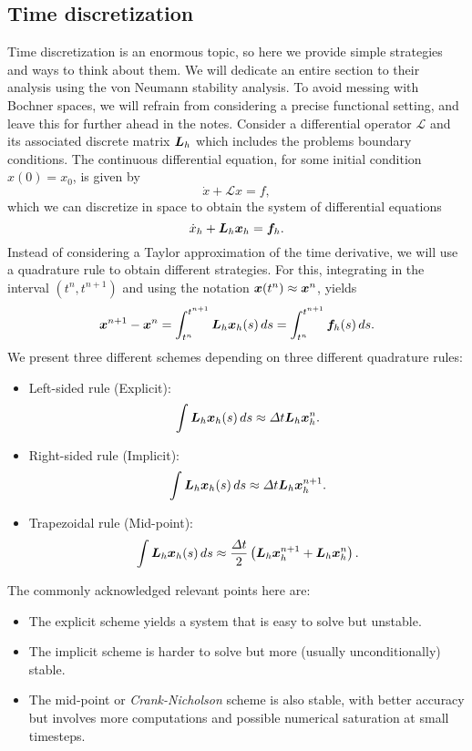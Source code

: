 \documentclass{article}
\renewcommand{\vec}{\vectorsym}
\newcommand{\mat}{\matrixsym}
\begin{document}
\subsection{Time discretization}
Time discretization is an enormous topic, so here we provide simple strategies and ways to think about them. We will dedicate an entire section to their analysis using the von Neumann stability analysis. To avoid messing with Bochner spaces, we will refrain from considering a precise functional setting, and leave this for further ahead in the notes. Consider a differential operator $\mathcal L$ and its associated discrete matrix $\mat L_h$ which includes the problems boundary conditions. The continuous differential equation, for some initial condition $x(0) = x_0$, is given by 
    $$ \dot x + \mathcal L x = f, $$
    which we can discretize in space to obtain the system of differential equations
    $$ \dot x_h + \mat L_h \vec x_h = \vec f_h. $$
    Instead of considering a Taylor approximation of the time derivative, we will use a quadrature rule to obtain different strategies. For this, integrating in the interval $(t^n, t^{n+1})$ and using the notation $\vec x(t^n) \approx \vec x^{n}$, yields
    $$ \vec x^{n+1} - \vec x^n = \int_{t^n}^{t^{n+1}} \mat L_h \vec x_h(s) \,ds = \int_{t^n}^{t^{n+1}} \vec f_h(s)\,ds. $$
    We present three different schemes depending on three different quadrature rules: 
    \begin{itemize}
        \item Left-sided rule (Explicit):
                $$ \int \mat L_h \vec x_h(s)\,ds \approx \Delta t \mat L_h\vec x_h^n. $$
        \item  Right-sided rule (Implicit): 
            $$ \int \mat L_h \vec x_h(s)\,ds \approx \Delta t\mat L_h\vec x_h^{n+1}. $$
        \item  Trapezoidal rule (Mid-point): 
            $$ \int \mat L_h \vec x_h(s)\,ds \approx \frac{\Delta t}{2}\left(\mat L_h\vec x_h^{n+1}+ \mat L_h \vec x_h^n\right). $$
    \end{itemize}
    The commonly acknowledged relevant points here are: 
    \begin{itemize}
        \item The explicit scheme yields a system that is easy to solve but unstable.
        \item The implicit scheme is harder to solve but more (usually unconditionally) stable.
        \item The mid-point or \emph{Crank-Nicholson} scheme is also stable, with better accuracy but involves more computations and possible numerical saturation at small timesteps.
    \end{itemize}
\end{document}

